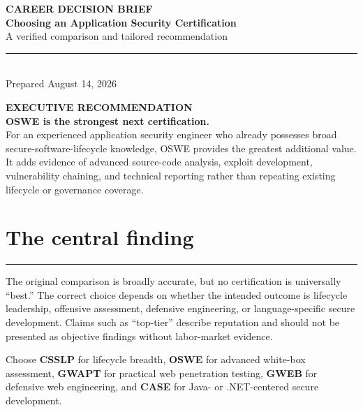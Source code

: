 \documentclass[11pt]{article}
\newcommand{\sectionrule}{\vspace{-2pt}\color{Rule}\rule{\linewidth}{0.6pt}\color{black}\vspace{2pt}}
\begin{document}
\begin{center}
  {\small\bfseries\color{Teal}\MakeUppercase{Career Decision Brief}}\\[9pt]
  {\fontsize{25}{29}\selectfont\bfseries\color{Navy}
  Choosing an Application Security Certification}\\[8pt]
  {\large\color{Muted}A verified comparison and tailored recommendation}\\[12pt]
  {\color{Gold}\rule{0.22\linewidth}{2.2pt}}\\[10pt]
  {\small\color{Muted}Prepared August 14, 2026}
\end{center}

\vspace{6pt}

\begin{tcolorbox}[
  enhanced,
  colback=Navy,
  colframe=Navy,
  boxrule=0pt,
  arc=2mm,
  left=5mm,right=5mm,top=4mm,bottom=4mm]
  {\small\bfseries\color{Gold}\MakeUppercase{Executive recommendation}}\\[3pt]
  {\Large\bfseries\color{white}OSWE is the strongest next certification.}\\[4pt]
  {\color{white}
  For an experienced application security engineer who already possesses broad
  secure-software-lifecycle knowledge, OSWE provides the greatest additional
  value. It adds evidence of advanced source-code analysis, exploit development,
  vulnerability chaining, and technical reporting rather than repeating existing
  lifecycle or governance coverage.}
\end{tcolorbox}

\section*{The central finding}
\sectionrule

The original comparison is broadly accurate, but no certification is universally
``best.'' The correct choice depends on whether the intended outcome is lifecycle
leadership, offensive assessment, defensive engineering, or language-specific
secure development. Claims such as ``top-tier'' describe reputation and should not
be presented as objective findings without labor-market evidence.

\begin{tcolorbox}[
  enhanced,
  colback=Mint,
  colframe=Teal,
  boxrule=0.7pt,
  arc=1.5mm,
  title={\bfseries\color{Navy}Decision rule},
  coltitle=Navy,
  fonttitle=\bfseries]
Choose \textbf{CSSLP} for lifecycle breadth, \textbf{OSWE} for advanced white-box
assessment, \textbf{GWAPT} for practical web penetration testing, \textbf{GWEB}
for defensive web engineering, and \textbf{CASE} for Java- or .NET-centered secure
development.
\end{tcolorbox}
\end{document}
